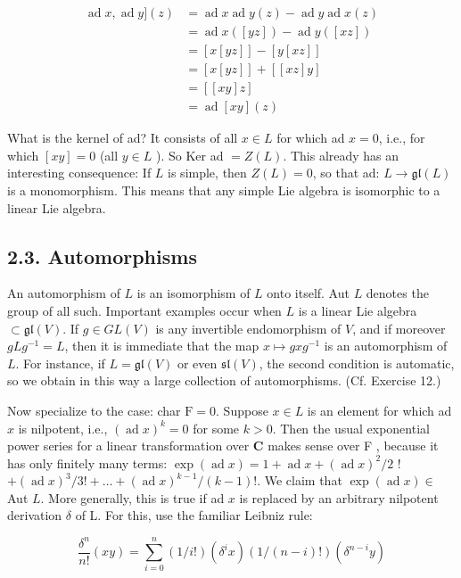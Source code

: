 \documentclass[10pt]{article}
\begin{document}
\begin{align*}
\operatorname{ad} x, \operatorname{ad} y](z) & =\operatorname{ad} x \operatorname{ad} y(z)-\operatorname{ad} y \operatorname{ad} x(z) \\
& =\operatorname{ad} x([y z])-\operatorname{ad} y([x z]) \\
& =[x[y z]]-[y[x z]] \\
& =[x[y z]]+[[x z] y]  \tag{$L2$'}\\
& =[[x y] z]  \tag{L3}\\
& =\operatorname{ad}[x y](z)
\end{align*}


What is the kernel of ad? It consists of all $x \in L$ for which ad $x=0$, i.e., for which $[x y]=0$ (all $y \in L$ ). So Ker ad $=Z(L)$. This already has an interesting consequence: If $L$ is simple, then $Z(L)=0$, so that ad: $L \rightarrow \mathfrak{g l}(L)$ is a monomorphism. This means that any simple Lie algebra is isomorphic to a linear Lie algebra.

\subsection*{2.3. Automorphisms}
An automorphism of $L$ is an isomorphism of $L$ onto itself. Aut $L$ denotes the group of all such. Important examples occur when $L$ is a linear Lie algebra $\subset \mathfrak{g l}(V)$. If $g \in G L(V)$ is any invertible endomorphism of $V$, and if moreover $g L g^{-1}=L$, then it is immediate that the map $x \mapsto g x g^{-1}$ is an automorphism of $L$. For instance, if $L=\mathfrak{g l}(V)$ or even $\mathfrak{s l}(V)$, the second condition is automatic, so we obtain in this way a large collection of automorphisms. (Cf. Exercise 12.)

Now specialize to the case: char $\mathrm{F}=0$. Suppose $x \in L$ is an element for which ad $x$ is nilpotent, i.e., $(\operatorname{ad} x)^{k}=0$ for some $k>0$. Then the usual exponential power series for a linear transformation over $\mathbf{C}$ makes sense over F , because it has only finitely many terms: $\exp (\operatorname{ad} x)=1+\operatorname{ad} x+(\operatorname{ad} x)^{2} / 2$ ! $+(\operatorname{ad} x)^{3} / 3!+\ldots+(\operatorname{ad} x)^{k-1} /(k-1)!$. We claim that $\exp (\operatorname{ad} x) \in$ Aut $L$. More generally, this is true if ad $x$ is replaced by an arbitrary nilpotent derivation $\delta$ of L. For this, use the familiar Leibniz rule:

$$
\frac{\delta^{n}}{n!}(x y)=\sum_{i=0}^{n}(1 / i!)\left(\delta^{i} x\right)(1 /(n-i)!)\left(\delta^{n-i} y\right)
$$
\end{document}
